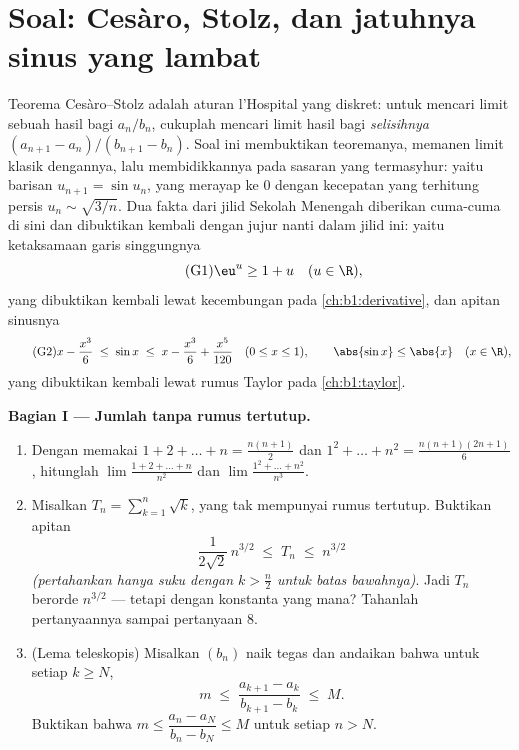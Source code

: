 \section{Soal: Cesàro, Stolz, dan jatuhnya sinus yang lambat}

\begin{problem}[{Soal akhir pekan --- teorema Cesàro--Stolz
dan asimtotik $u_n \sim \sqrt{3/n}$ untuk $u_{n+1} = \sin
u_n$}]
\label{pb:b1:seq:1}
Teorema Cesàro--Stolz adalah aturan l'Hospital yang diskret: untuk
mencari limit sebuah hasil bagi $a_n/b_n$, cukuplah mencari
limit hasil bagi \emph{selisihnya} $(a_{n+1} -
a_n)/(b_{n+1} - b_n)$. Soal ini membuktikan teoremanya, memanen
limit klasik dengannya, lalu membidikkannya pada sasaran yang termasyhur:
yaitu barisan $u_{n+1} = \sin u_n$, yang merayap ke $0$ dengan
kecepatan yang terhitung persis $u_n \sim \sqrt{3/n}$. Dua fakta dari jilid Sekolah
Menengah diberikan cuma-cuma di sini dan dibuktikan kembali dengan jujur nanti dalam jilid
ini: yaitu ketaksamaan garis singgungnya
\[
\tag{G1} \eu^{u} \geq 1 + u \quad (u \in \R),
\]
yang dibuktikan kembali lewat kecembungan pada \cref{ch:b1:derivative}, dan apitan
sinusnya
\[
\tag{G2} x - \frac{x^3}{6} \;\leq\; \sin x \;\leq\; x -
\frac{x^3}{6} + \frac{x^5}{120} \quad (0 \leq x \leq 1), \qquad
\abs{\sin x} \leq \abs{x} \quad (x \in \R),
\]
yang dibuktikan kembali lewat rumus Taylor pada \cref{ch:b1:taylor}.

\medskip
\noindent\textbf{Bagian I --- Jumlah tanpa rumus tertutup.}
\begin{enumerate}
  \item Dengan memakai $1 + 2 + \dots + n = \frac{n(n+1)}{2}$ dan $1^2 +
        \dots + n^2 = \frac{n(n+1)(2n+1)}{6}$, hitunglah
        $\lim \frac{1 + 2 + \dots + n}{n^2}$ dan $\lim \frac{1^2 +
        \dots + n^2}{n^3}$.
  \item Misalkan $T_n = \sum_{k=1}^n \sqrt k$, yang tak mempunyai rumus
        tertutup. Buktikan apitan
        \[
        \frac{1}{2\sqrt 2}\,n^{3/2} \;\leq\; T_n \;\leq\;
        n^{3/2}
        \]
        \emph{(pertahankan hanya suku dengan $k > \frac n2$ untuk batas
        bawahnya)}. Jadi $T_n$ berorde $n^{3/2}$ --- tetapi dengan
        konstanta yang mana? Tahanlah pertanyaannya sampai pertanyaan 8.
  \item (Lema teleskopis) Misalkan $(b_n)$ naik tegas
        dan andaikan bahwa untuk setiap $k \geq N$,
        \[
        m \;\leq\; \frac{a_{k+1} - a_k}{b_{k+1} - b_k} \;\leq\;
        M .
        \]
        Buktikan bahwa $m \leq \dfrac{a_n - a_N}{b_n - b_N} \leq M$
        untuk setiap $n > N$.
\end{enumerate}


\end{problem}

